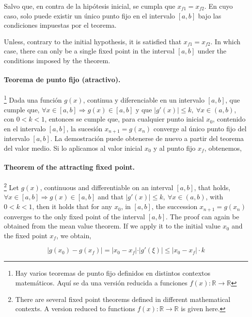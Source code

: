 \begin{paracol}{2}
Salvo que, en contra de la hipótesis inicial, se cumpla que  $ x_{f1}=x_{f2}$. En cuyo caso, solo puede existir un único punto fijo en el intervalo $[a, b]$ bajo las condiciones impuestas por el teorema.

\switchcolumn
Unless, contrary to the initial hypothesis, it is satisfied that $ x_{f1}=x_{f2}$. In which case, there can only be a single fixed point in the interval $[a, b]$ under the conditions imposed by the theorem.

\switchcolumn

\paragraph{Teorema de punto fijo (atractivo).} \footnote{Hay varios teoremas de punto fijo definidos en distintos contextos matemáticos. Aquí se da una versión reducida a funciones $f(x):\mathbb{R} \rightarrow \mathbb{R}$} Dada una función $g(x)$,  continua y diferenciable en un intervalo $[a, b]$, que  cumple que, $\forall x \in [a, b] \Rightarrow g(x)\in [a,b]$ y que  $\vert g'(x) \vert \leq k, \  \forall x \in (a, b)$, con $0<k<1$, entonces se cumple que, para cualquier punto inicial $x_0$, contenido en el intervalo $[a, b]$, la sucesión  $x_{n+1}=g(x_n)$ converge al único punto fijo del intervalo $[a, b]$.
La demostración puede obtenerse de nuevo a partir del teorema del valor medio. Si lo aplicamos al valor inicial $x_0$ y al punto fijo $x_f$, obtenemos,
\switchcolumn

\paragraph{Theorem of the attracting fixed point.} \footnote{There are several fixed point theorems defined in different mathematical contexts. A version reduced to functions $f(x):\mathbb{R} \rightarrow \mathbb{R}$ is given here.} Let $g(x)$,  continuous and differentiable on an interval $[a, b]$, that holds, $\forall x \in [a, b] \Rightarrow g(x)\in [a,b]$ and that  $\vert g'(x) \vert \leq k, \  \forall x \in (a, b)$, with $0<k<1$, then it holds that for any $x_0$, in $[a, b]$, the succession  $x_{n+1}=g(x_n)$ converges to the only fixed point of the interval $[a, b]$.
The proof can again be obtained from the mean value theorem. If we apply it to the initial value $x_0$ and the fixed point $x_f$, we obtain,

\begin{equation*}
\vert g(x_0)-g(x_f) \vert =\vert x_0-x_f \vert \cdot \vert g'(\xi) \vert \leq \vert x_0-x_f \vert \cdot k 
\end{equation*}


\end{paracol}
